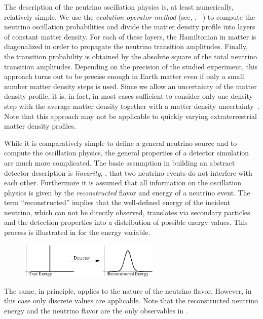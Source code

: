 The description of the neutrino oscillation physics is, at least numerically, relatively simple. We use the {\em evolution operator method} (see, \eg, \Ref~\cite{Ohlsson:1999um})  to compute the neutrino oscillation probabilities and divide the matter density profile into layers of constant matter density. For each of these layers, the Hamiltonian in matter is diagonalized in order to propagate the neutrino transition amplitudes. Finally, the transition probability is obtained by the absolute square of the total neutrino transition amplitudes. Depending on the precision of the studied experiment, this approach turns out to be precise enough in Earth matter even if only a small number matter density steps is used. Since we allow an uncertainty of the matter density profile, it is, in fact, in most cases sufficient to consider only one density step with the average matter density together with a matter density uncertainty~\cite{Ohlsson:2003ip}. Note that this approach may not be applicable to quickly varying extraterrestrial matter density profiles.

While it is comparatively simple to define a general neutrino source 
and to compute the oscillation physics, the general properties of a detector simulation are much more complicated. The basic assumption in building an abstract detector description is \emph{linearity}, \ie , that two neutrino events do not interfere with each other. Furthermore it is assumed that all information on the oscillation physics 
is given by the \emph{reconstructed} flavor and energy of a 
neutrino event. The term ``reconstructed'' implies that the well-defined energy of the incident neutrino, which can not be directly observed, translates via secondary particles and the detection properties into a distribution of possible energy values. This process is illustrated in  for the energy variable. 
%
\begin{figure}[ht]
\begin{center}
\includegraphics[width=0.6\textwidth]{mapping}
\end{center}
\end{figure}
% 
The same, in principle, applies to the nature of the neutrino flavor. However, in this case only discrete values are applicable. Note that the reconstructed neutrino energy and the neutrino flavor are the only observables in \GLOBES .

